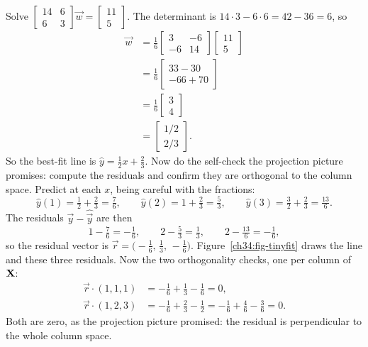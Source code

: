 Solve $\begin{bmatrix} 14&6\\6&3 \end{bmatrix}\vec{w}=\begin{bmatrix}11\\5\end{bmatrix}$.
The determinant is $14\cdot 3 - 6\cdot 6 = 42-36 = 6$, so
\begin{align*}
\vec{w} &= \frac{1}{6}\begin{bmatrix} 3 & -6 \\ -6 & 14 \end{bmatrix}
\begin{bmatrix} 11 \\ 5 \end{bmatrix} \\
&= \frac{1}{6}\begin{bmatrix} 33-30 \\ -66+70 \end{bmatrix} \\
&= \frac{1}{6}\begin{bmatrix} 3 \\ 4 \end{bmatrix} \\
&= \begin{bmatrix} 1/2 \\ 2/3 \end{bmatrix}.
\end{align*}
So the best-fit line is $\hat{y} = \tfrac12 x + \tfrac23$. Now do the self-check the
projection picture promises: compute the residuals and confirm they are orthogonal to
the column space. Predict at each $x$, being careful with the fractions:
\[
\hat y(1)=\tfrac12+\tfrac23=\tfrac76,\qquad
\hat y(2)=1+\tfrac23=\tfrac53,\qquad
\hat y(3)=\tfrac32+\tfrac23=\tfrac{13}{6}.
\]
The residuals $\vec{y}-\hat{\vec{y}}$ are then
\[
1-\tfrac76=-\tfrac16,\qquad
2-\tfrac53=\tfrac13,\qquad
2-\tfrac{13}{6}=-\tfrac16,
\]
so the residual vector is $\vec{r}=\big(-\tfrac16,\,\tfrac13,\,-\tfrac16\big)$.
Figure~\ref{ch34:fig-tinyfit} draws the line and these three residuals. Now the two
orthogonality checks, one per column of $\mathbf{X}$:
\begin{align*}
\vec{r}\cdot(1,1,1) &= -\tfrac16+\tfrac13-\tfrac16 = 0, \\
\vec{r}\cdot(1,2,3) &= -\tfrac16+\tfrac23-\tfrac12 = -\tfrac16+\tfrac46-\tfrac36 = 0.
\end{align*}
Both are zero, as the projection picture promised: the residual is perpendicular to the
whole column space.

